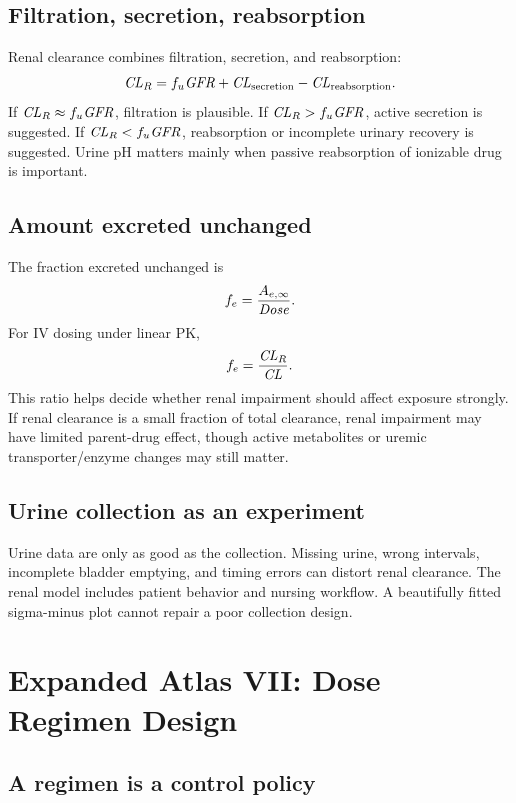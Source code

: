 \subsection{Filtration, secretion, reabsorption}

Renal clearance combines filtration, secretion, and reabsorption:
\[
  \pkCL_R
  =
  f_u\pksym{GFR}
  +
  \pkCL_{\pklab{secretion}}
  -
  \pkCL_{\pklab{reabsorption}}.
\]
If \(\pkCL_R\approx f_u\pksym{GFR}\), filtration is plausible. If \(\pkCL_R>f_u\pksym{GFR}\), active secretion is suggested. If \(\pkCL_R<f_u\pksym{GFR}\), reabsorption or incomplete urinary recovery is suggested. Urine pH matters mainly when passive reabsorption of ionizable drug is important.

\figureRenalHandling

\subsection{Amount excreted unchanged}

The fraction excreted unchanged is
\[
  f_e=\frac{A_{e,\infty}}{\pksym{Dose}}.
\]
For IV dosing under linear PK,
\[
  f_e=\frac{\pkCL_R}{\pkCL}.
\]
This ratio helps decide whether renal impairment should affect exposure strongly. If renal clearance is a small fraction of total clearance, renal impairment may have limited parent-drug effect, though active metabolites or uremic transporter/enzyme changes may still matter.

\subsection{Urine collection as an experiment}

Urine data are only as good as the collection. Missing urine, wrong intervals, incomplete bladder emptying, and timing errors can distort renal clearance. The renal model includes patient behavior and nursing workflow. A beautifully fitted sigma-minus plot cannot repair a poor collection design.

\section{Expanded Atlas VII: Dose Regimen Design}

\subsection{A regimen is a control policy}

